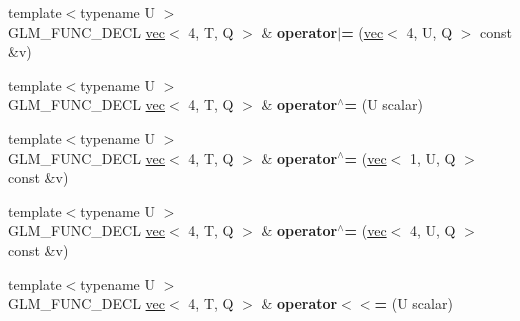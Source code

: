 \begin{DoxyCompactItemize}
\item 
\mbox{\label{structglm_1_1vec_3_014_00_01T_00_01Q_01_4_a887b2dab7b2fdd88f5d7437fd3ad7b6e}} 
{\footnotesize template$<$typename U $>$ }\\G\+L\+M\+\_\+\+F\+U\+N\+C\+\_\+\+D\+E\+CL \hyperlink{structglm_1_1vec}{vec}$<$ 4, T, Q $>$ \& {\bfseries operator$\vert$=} (\hyperlink{structglm_1_1vec}{vec}$<$ 4, U, Q $>$ const \&v)
\item 
\mbox{\label{structglm_1_1vec_3_014_00_01T_00_01Q_01_4_aafc3dadf109f736576a6e0086b7f1006}} 
{\footnotesize template$<$typename U $>$ }\\G\+L\+M\+\_\+\+F\+U\+N\+C\+\_\+\+D\+E\+CL \hyperlink{structglm_1_1vec}{vec}$<$ 4, T, Q $>$ \& {\bfseries operator$^\wedge$=} (U scalar)
\item 
\mbox{\label{structglm_1_1vec_3_014_00_01T_00_01Q_01_4_aa451218815315cd25f43b5d3e5e4f66f}} 
{\footnotesize template$<$typename U $>$ }\\G\+L\+M\+\_\+\+F\+U\+N\+C\+\_\+\+D\+E\+CL \hyperlink{structglm_1_1vec}{vec}$<$ 4, T, Q $>$ \& {\bfseries operator$^\wedge$=} (\hyperlink{structglm_1_1vec}{vec}$<$ 1, U, Q $>$ const \&v)
\item 
\mbox{\label{structglm_1_1vec_3_014_00_01T_00_01Q_01_4_af2365ef058b52638e4f9b3119f1efaa7}} 
{\footnotesize template$<$typename U $>$ }\\G\+L\+M\+\_\+\+F\+U\+N\+C\+\_\+\+D\+E\+CL \hyperlink{structglm_1_1vec}{vec}$<$ 4, T, Q $>$ \& {\bfseries operator$^\wedge$=} (\hyperlink{structglm_1_1vec}{vec}$<$ 4, U, Q $>$ const \&v)
\item 
\mbox{\label{structglm_1_1vec_3_014_00_01T_00_01Q_01_4_a4520239c55fdd62342d10feb560a0371}} 
{\footnotesize template$<$typename U $>$ }\\G\+L\+M\+\_\+\+F\+U\+N\+C\+\_\+\+D\+E\+CL \hyperlink{structglm_1_1vec}{vec}$<$ 4, T, Q $>$ \& {\bfseries operator$<$$<$=} (U scalar)
\item 
\mbox{\label{structglm_1_1vec_3_014_00_01T_00_01Q_01_4_a2bebbff20e52b3c0ceaab741bbaefec8}} 

\end{DoxyCompactItemize}
